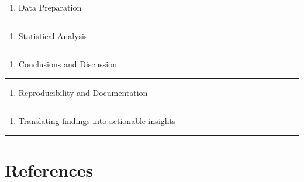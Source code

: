 \documentclass[
  letterpaper,
  DIV=11,
  numbers=noendperiod]{scrreprt}
\providecommand{\tightlist}{%
  \setlength{\itemsep}{0pt}\setlength{\parskip}{0pt}}\usepackage{longtable,booktabs,array}
\newlength{\cslhangindent}
\newenvironment{CSLReferences}[2] %
 {\begin{list}{}{%
  \setlength{\itemindent}{0pt}
  \setlength{\leftmargin}{0pt}
  \setlength{\parsep}{0pt}
  \ifodd #1
   \setlength{\leftmargin}{\cslhangindent}
   \setlength{\itemindent}{-1\cslhangindent}
  \fi
  \setlength{\itemsep}{#2\baselineskip}}}
 {\end{list}}
\begin{document}
\begin{enumerate}
\def\labelenumi{\arabic{enumi}.}
\setcounter{enumi}{3}
\tightlist
\item
  Data Preparation
\end{enumerate}

\begin{center}\rule{0.5\linewidth}{0.5pt}\end{center}

\begin{enumerate}
\def\labelenumi{\arabic{enumi}.}
\setcounter{enumi}{4}
\tightlist
\item
  Statistical Analysis
\end{enumerate}

\begin{center}\rule{0.5\linewidth}{0.5pt}\end{center}

\begin{enumerate}
\def\labelenumi{\arabic{enumi}.}
\setcounter{enumi}{5}
\tightlist
\item
  Conclusions and Discussion
\end{enumerate}

\begin{center}\rule{0.5\linewidth}{0.5pt}\end{center}

\begin{enumerate}
\def\labelenumi{\arabic{enumi}.}
\setcounter{enumi}{6}
\tightlist
\item
  Reproducibility and Documentation
\end{enumerate}

\begin{center}\rule{0.5\linewidth}{0.5pt}\end{center}

\begin{enumerate}
\def\labelenumi{\arabic{enumi}.}
\setcounter{enumi}{7}
\tightlist
\item
  Translating findings into actionable insights
\end{enumerate}

\begin{center}\rule{0.5\linewidth}{0.5pt}\end{center}


\chapter*{References}\label{references}


\label{refs}
\begin{CSLReferences}{0}{1}
\end{CSLReferences}
\end{document}
